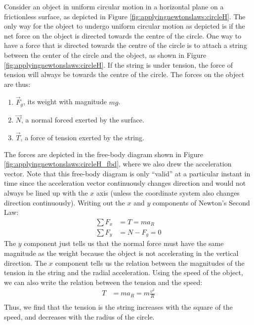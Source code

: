 Consider an object in uniform circular motion in a horizontal plane on a frictionless surface, as depicted in Figure \ref{fig:applyingnewtonslaws:circleH}.
The only way for the object to undergo uniform circular motion as depicted is if the net force on the object is directed towards the centre of the circle. One way to have a force that is directed towards the centre of the circle is to attach a string between the center of the circle and the object, as shown in Figure \ref{fig:applyingnewtonslaws:circleH}. If the string is under tension, the force of tension will always be towards the centre of the circle. The forces on the object are thus:
\begin{enumerate}
\item $\vec F_g$, its weight with magnitude $mg$.
\item $\vec N$, a normal forced exerted by the surface.
\item $\vec T$, a force of tension exerted by the string.
\end{enumerate}
The forces are depicted in the free-body diagram shown in Figure \ref{fig:applyingnewtonslaws:circleH_fbd}, where we also drew the acceleration vector. Note that this free-body diagram is only ``valid'' at a particular instant in time since the acceleration vector continuously changes direction and would not always be lined up with the $x$ axis (unless the coordinate system also changes direction continuously). 
Writing out the $x$ and $y$ components of Newton's Second Law:
\begin{align*}
\sum F_x &= T = ma_R\\
\sum F_y &= N - F_g =0
\end{align*}
The $y$ component just tells us that the normal force must have the same magnitude as the weight because the object is not accelerating in the vertical direction. The $x$ component tells us the relation between the magnitudes of the tension in the string and the radial acceleration. Using the speed of the object, we can also write the relation between the tension and the speed:
\begin{align*}
T &= ma_R=m\frac{v^2}{R}\\
\end{align*}
Thus, we find that the tension is the string increases with the square of the speed, and decreases with the radius of the circle.


